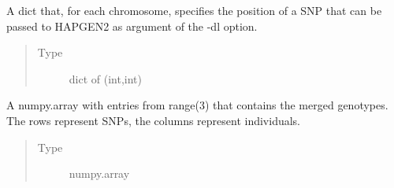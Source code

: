 \documentclass[a4paper,10pt,english]{sphinxhowto}
\begin{document}
\begin{fulllineitems}
\begin{fulllineitems}
\begin{quote}
\begin{description}
\end{description}\end{quote}

\end{fulllineitems}


\begin{fulllineitems}
\label{\detokenize{utils:utils.genotype_corpus_generator.GenotypeCorpusGenerator.dummy_disease_snps}}
A dict that, for each chromosome, specifies the position
of a SNP that can be passed to HAPGEN2 as argument of the -dl option.
\begin{quote}\begin{description}
\item[{Type}] \leavevmode
dict of (int,int)

\end{description}\end{quote}

\end{fulllineitems}


\begin{fulllineitems}
\label{\detokenize{utils:utils.genotype_corpus_generator.GenotypeCorpusGenerator.genotype}}
A numpy.array with entries from range(3) that contains the merged genotypes.
The rows represent SNPs, the columns represent individuals.
\begin{quote}\begin{description}
\item[{Type}] \leavevmode
numpy.array

\end{description}\end{quote}

\end{fulllineitems}



\end{fulllineitems}
\end{document}
